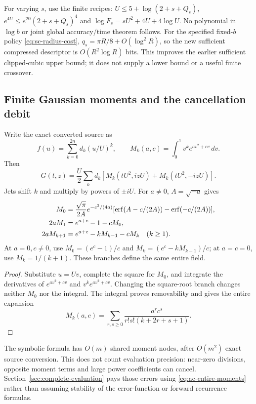 For varying $s$, use the finite recipes: $U\le5+\log(2+s+Q_s)$,
$e^{4U}\le e^{20}(2+s+Q_s)^4$ and
$\log F_s=sU^2+4U+4\log U$. No polynomial in $\log b$ or joint
global accuracy/time theorem follows. For the specified fixed-$b$
policy \eqref{eq:sc-radius-cost}, $q_s=\pi R/8+O(\log^2R)$,
so the new sufficient compressed descriptor is $O(R^2\log R)$ bits.
This improves the earlier sufficient clipped-cubic upper bound; it
does not supply a lower bound or a useful finite crossover.

\subsection{Finite Gaussian moments and the cancellation debit}
\begin{proposition}\label{prop:ac-moments}
Write the exact converted source as
\[ f(u)=\sum_{k=0}^{2n}d_k(u/U)^k,\qquad
 M_k(a,c)=\int_0^1v^ke^{av^2+cv}\,dv. \]
Then
\begin{equation}
 G(t,z)=\frac U2\sum_kd_k[M_k(tU^2,izU)+M_k(tU^2,-izU)].
 \label{eq:ac-moments}
\end{equation}
Jets shift $k$ and multiply by powers of $\pm iU$. For $a\ne0$,
$A=\sqrt{-a}$ gives
\begin{align}
 M_0&=\frac{\sqrt\pi}{2A}e^{-c^2/(4a)}
       [\operatorname{erf}(A-c/(2A))-\operatorname{erf}(-c/(2A))],\notag\\
 2aM_1&=e^{a+c}-1-cM_0,\notag\\
 2aM_{k+1}&=e^{a+c}-kM_{k-1}-cM_k\quad(k\ge1).
 \label{eq:ac-moment-recurrence}
\end{align}
At $a=0,c\ne0$, use $M_0=(e^c-1)/c$ and
$M_k=(e^c-kM_{k-1})/c$; at $a=c=0$, use $M_k=1/(k+1)$.
These branches define the same entire field.
\end{proposition}
\begin{proof}
Substitute $u=Uv$, complete the square for $M_0$, and integrate the
derivatives of $e^{av^2+cv}$ and $v^ke^{av^2+cv}$. Changing the
square-root branch changes neither $M_0$ nor the integral. The integral
proves removability and gives the entire expansion
\begin{equation}
 M_k(a,c)=\sum_{r,s\ge0}\frac{a^rc^s}{r!s!(k+2r+s+1)}.
 \label{eq:ac-entire-moments}
\end{equation}
\end{proof}
The symbolic formula has $O(m)$ shared moment nodes, after $O(m^2)$
exact source conversion. This does not count evaluation precision:
near-zero divisions, opposite moment terms and large power coefficients
can cancel. Section~\ref{sec:complete-evaluation} pays those errors
using \eqref{eq:ac-entire-moments} rather than assuming stability of
the error-function or forward recurrence formulas.
